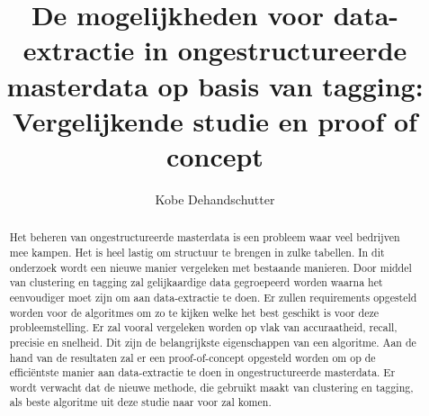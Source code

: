 \documentclass{hogent-article}
\title{De mogelijkheden voor data-extractie in ongestructureerde masterdata op basis van tagging: Vergelijkende studie en proof of concept}
\author{Kobe Dehandschutter}
\begin{document}
\begin{abstract}

  Het beheren van ongestructureerde masterdata is een probleem waar veel bedrijven mee kampen. Het is heel lastig om structuur te brengen in zulke tabellen. In dit onderzoek wordt een nieuwe manier vergeleken met bestaande manieren. Door middel van clustering en tagging zal gelijkaardige data gegroepeerd worden waarna het eenvoudiger moet zijn om aan data-extractie te doen. Er zullen requirements opgesteld worden voor de algoritmes om zo te kijken welke het best geschikt is voor deze probleemstelling. Er zal vooral vergeleken worden op vlak van accuraatheid, recall, precisie en snelheid. Dit zijn de belangrijkste eigenschappen van een algoritme. Aan de hand van de resultaten zal er een proof-of-concept opgesteld worden om op de efficiëntste manier aan data-extractie te doen in ongestructureerde masterdata. Er wordt verwacht dat de nieuwe methode, die gebruikt maakt van clustering en tagging, als beste algoritme uit deze studie naar voor zal komen.
\end{abstract}


\tableofcontents


\printbibliography[heading=bibintoc]
\end{document}
